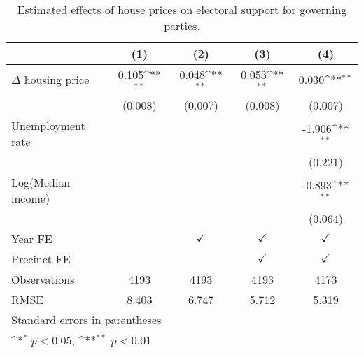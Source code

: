 \begin{table}[htbp]\centering
\def\sym#1{\ifmmode^{#1}\else\(^{#1}\)\fi}
\caption{Estimated effects of house prices on electoral support for governing parties.} \label{predv}
\begin{tabular}{l*{4}{c}}
\hline\hline
                    &\multicolumn{1}{c}{(1)}        &\multicolumn{1}{c}{(2)}        &\multicolumn{1}{c}{(3)}        &\multicolumn{1}{c}{(4)}        \\
\hline
$\Delta$ housing price&       0.105\sym{**}&       0.048\sym{**}&       0.053\sym{**}&       0.030\sym{**}\\
                    &     (0.008)        &     (0.007)        &     (0.008)        &     (0.007)        \\
[1em]
Unemployment rate   &                    &                    &                    &      -1.906\sym{**}\\
                    &                    &                    &                    &     (0.221)        \\
[1em]
Log(Median income)  &                    &                    &                    &      -0.893\sym{**}\\
                    &                    &                    &                    &     (0.064)        \\
[1em]
\hline Year FE      &                    &$\checkmark$        &$\checkmark$        &$\checkmark$        \\
[1em]
Precinct FE         &                    &                    &$\checkmark$        &$\checkmark$        \\
\hline
Observations        &        4193        &        4193        &        4193        &        4173        \\
RMSE                &       8.403        &       6.747        &       5.712        &       5.319        \\
\hline\hline
\multicolumn{5}{l}{\footnotesize Standard errors in parentheses}\\
\multicolumn{5}{l}{\footnotesize \sym{*} \(p<0.05\), \sym{**} \(p<0.01\)}\\
\end{tabular}
\end{table}
